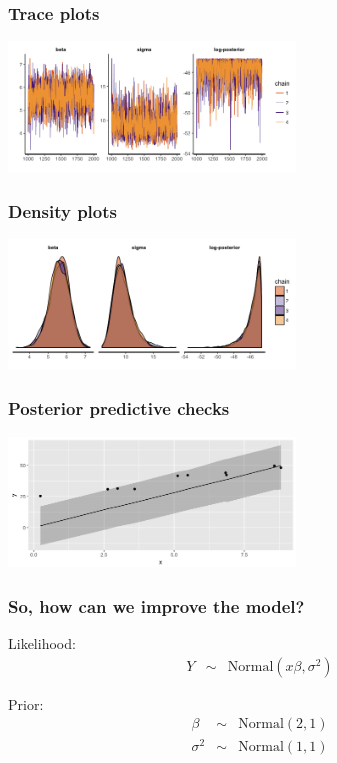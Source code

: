 \documentclass[xcolor=table]{beamer}
\begin{document}
\begin{frame}
  \frametitle{Trace plots}
  \begin{center}
    \includegraphics[width=3in]{../figures/linear_trace.png}
  \end{center}
\end{frame}

\begin{frame}
  \frametitle{Density plots}
  \begin{center}
    \includegraphics[width=3in]{../figures/linear_dens_plot.png}
  \end{center}
\end{frame}

\begin{frame}
  \frametitle{Posterior predictive checks}
  \begin{center}
    \includegraphics[width=3in]{../figures/linear_pred.png}
  \end{center}
\end{frame}

\begin{frame}
  \frametitle{So, how can we improve the model?}

  Likelihood:
  \begin{eqnarray*}
    Y & \sim & \mathrm{Normal}(x \beta, \sigma^2)
  \end{eqnarray*}

  Prior:
  \begin{eqnarray*}
    \beta & \sim & \mathrm{Normal}(2, 1) \\
    \sigma^2 & \sim & \mathrm{Normal}(1, 1)
  \end{eqnarray*}

\end{frame}
\end{document}
